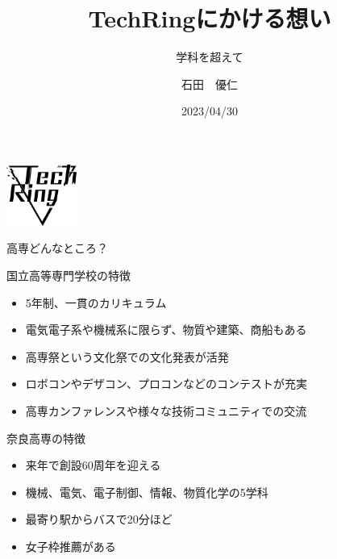 \documentclass[dvipdfmx]{beamer}
\title{TechRingにかける想い}
\subtitle{学科を超えて}
\author[Jin]{石田　優仁}
\institute[TechRing]{奈良高専TechRing}
\date[2023/04/30]{2023/04/30}
\begin{document}
\begin{frame}
  \begin{flushright}
      \includegraphics[width=2.3cm]{pic/Logo.png}
  \end{flushright}
  \titlepage
\end{frame}

\begin{frame}{高専どんなところ？}

  \begin{block}{国立高等専門学校の特徴}
    \begin{itemize}
      \setlength{\itemsep}{1mm}
      \item 5年制、一貫のカリキュラム
      \item 電気電子系や機械系に限らず、物質や建築、商船もある
      \item 高専祭という文化祭での文化発表が活発
      \item ロボコンやデザコン、プロコンなどのコンテストが充実
      \item 高専カンファレンスや様々な技術コミュニティでの交流
    \end{itemize}
  \end{block}

  \begin{alertblock}{奈良高専の特徴}
      \begin{itemize}
        \setlength{\itemsep}{1mm}
        \item 来年で創設60周年を迎える
        \item 機械、電気、電子制御、情報、物質化学の5学科
        \item 最寄り駅からバスで20分ほど
        \item 女子枠推薦がある
      \end{itemize}
  \end{alertblock}

\end{frame}
\end{document}
